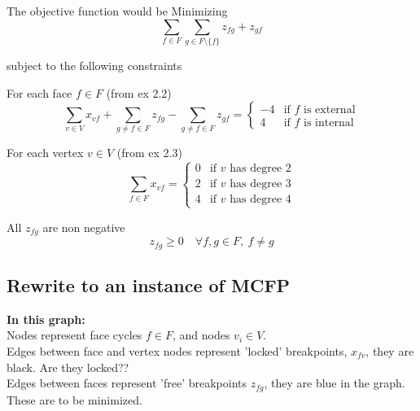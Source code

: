 The objective function would be Minimizing
$$ \sum_{f\in F} \sum_{g \in F \setminus{\{f\} }} {z_{fg} + z_{gf} }$$

subject to the following constraints

For each face $f \in F$ (from ex 2.2)
$$\sum_{v \in V}{x_{vf}} + \sum_{g \neq f \in F}{z_{fg}} - \sum_{g \neq f \in F}{z_{gf}} = \begin{cases} -4 & \text{if $f$ is external} \\ 4 & \text{if $f$ is internal}\end{cases}
$$

For each vertex $v \in V$ (from ex 2.3)
$$  \sum_{f \in F} {x_{vf}} = \begin{cases}
                                0 & \text{if $v$ has degree } 2 \\
                                2 & \text{if $v$ has degree } 3 \\
                                4 & \text{if $v$ has degree } 4
                              \end{cases}
$$

All $z_{fg}$ are non negative
$$ z_{fg} \ge 0 \quad \forall f, g \in F, \:f\neq g $$

\subsection{Rewrite to an instance of MCFP}
\textbf{In this graph:} \\
Nodes represent face cycles $f \in F$, and nodes $v_i \in V$.\\
Edges between face and vertex nodes represent 'locked' breakpoints, $x_{fv}$, they are black. Are they locked??\\
Edges between faces represent 'free' breakpoints $z_{fg}$, they are blue in the graph. These are to be minimized.

